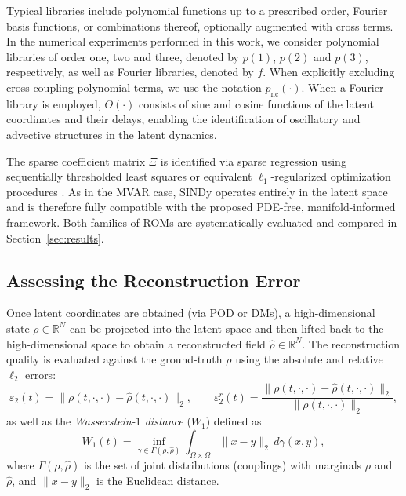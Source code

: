 \documentclass{article}
\begin{document}
Typical libraries include polynomial functions up to a prescribed order, Fourier basis functions, or combinations thereof, optionally augmented with cross terms. In the numerical experiments performed in this work, we consider polynomial libraries of order one, two and three, denoted by $p(1)$, $p(2)$ and $p(3)$, respectively, as well as Fourier libraries, denoted by $f$. When explicitly excluding cross-coupling polynomial terms, we use the notation $p_{\mathrm{nc}}(\cdot)$. When a Fourier library is employed, $\Theta(\cdot)$ consists of sine and cosine functions of the latent coordinates and their delays, enabling the identification of oscillatory and advective structures in the latent dynamics.

The sparse coefficient matrix $\Xi$ is identified via sparse regression using sequentially thresholded least squares or equivalent $\ell_1$-regularized optimization procedures \cite{brunton2016discovering}. As in the MVAR case, SINDy operates entirely in the latent space and is therefore fully compatible with the proposed PDE-free, manifold-informed framework. Both families of ROMs are systematically evaluated and compared in Section~\ref{sec:results}.

\subsection{Assessing the Reconstruction Error}
\label{subsec:recon_err}

Once latent coordinates are obtained (via POD or DMs), a high-dimensional state $\rho \in \mathbb{R}^{N}$ can be projected into the latent space and then lifted back to the high-dimensional space to obtain a reconstructed field $\hat{\rho} \in \mathbb{R}^{N}$. The reconstruction quality is evaluated against the ground-truth $\rho$ using the absolute and relative \(\ell_2\) errors:
\begin{equation}
\varepsilon_2(t) = \| \rho(t,\cdot,\cdot) - \hat{\rho}(t,\cdot,\cdot) \|_2, 
\qquad
\varepsilon^r_2(t) = \frac{\| \rho(t,\cdot,\cdot) - \hat{\rho}(t,\cdot,\cdot) \|_2}{\| \rho(t,\cdot,\cdot) \|_2},
\label{eq:L2_errors}
\end{equation}
as well as the \emph{Wasserstein-$1$ distance} ($W_1$) \cite{villani2009optimal,piccoli2014generalized,cristiani2014evolution,piccoli2016properties} defined as
\begin{equation}
W_1(t) =  \inf_{\gamma \in \Gamma(\rho, \hat{\rho})} \int_{\Omega \times \Omega} \|x - y\|_2 \, d\gamma(x,y),
\label{eq:wasserstein}
\end{equation}
where $\Gamma(\rho, \hat{\rho})$ is the set of joint distributions (couplings) with marginals $\rho$ and $\hat{\rho}$, and $\|x-y\|_2$ is the Euclidean distance.  
\end{document}
